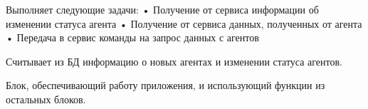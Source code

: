 Выполняет следующие задачи:
•	Получение от сервиса информации об изменении статуса агента
•	Получение от сервиса данных, полученных от агента
•	Передача в сервис команды на запрос данных с агентов


Считывает из БД информацию о новых агентах и изменении статуса агентов.

Блок, обеспечивающий работу приложения, и использующий функции из остальных блоков.

